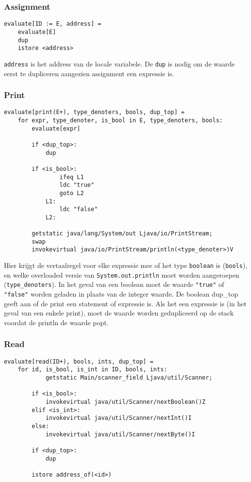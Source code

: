 \documentclass[]{article}
\begin{document}
\subsubsection{Assignment}
\begin{verbatim}
evaluate[ID := E, address] =
    evaluate[E]
    dup
    istore <address>
\end{verbatim}

\texttt{address} is het address van de locale variabele. De \texttt{dup} is nodig om de waarde eerst te dupliceren aangezien assignment een expressie is.

\subsubsection{Print}
\begin{verbatim}
evaluate[print(E+), type_denoters, bools, dup_top] =
    for expr, type_denoter, is_bool in E, type_denoters, bools:
        evaluate[expr]

        if <dup_top>:
            dup		
		
        if <is_bool>:
                ifeq L1
                ldc "true"
                goto L2
            L1:
                ldc "false"
            L2:
		
        getstatic java/lang/System/out Ljava/io/PrintStream;
        swap
        invokevirtual java/io/PrintStream/println(<type_denoter>)V
\end{verbatim}

Hier krijgt de vertaalregel voor elke expressie mee of het type \texttt{boolean} is (\texttt{bools}), en welke overloaded versie van \texttt{System.out.println} moet worden aangeroepen (\texttt{type\_denoters}). In het geval van een boolean moet de waarde \texttt{"true"} of \texttt{"false"} worden geladen in plaats van de integer waarde. De boolean dup\_top geeft aan of de print een statement of expressie is. Als het een expressie is (in het geval van een enkele print), moet de waarde worden gedupliceerd op de stack voordat de println de waarde popt.

\subsubsection{Read}
\begin{verbatim}
evaluate[read(ID+), bools, ints, dup_top] =
    for id, is_bool, is_int in ID, bools, ints:
		    getstatic Main/scanner_field Ljava/util/Scanner;
		
        if <is_bool>:
            invokevirtual java/util/Scanner/nextBoolean()Z
        elif <is_int>:
            invokevirtual java/util/Scanner/nextInt()I
        else:
            invokevirtual java/util/Scanner/nextByte()I		
				
        if <dup_top>:
            dup		
		
        istore address_of(<id>)
\end{verbatim}
\end{document}
